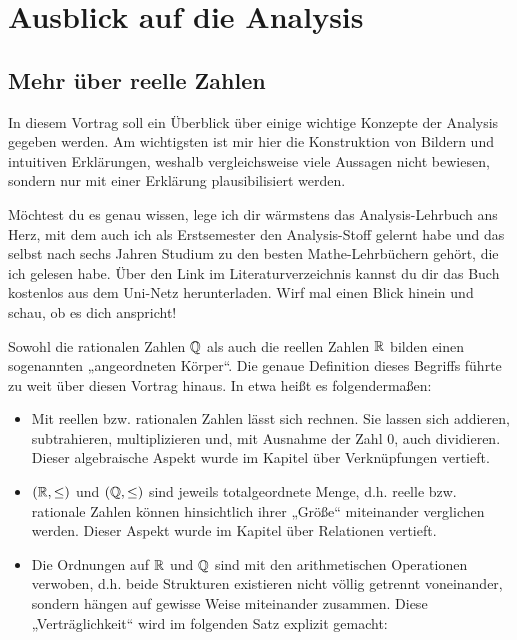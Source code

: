 



\chapter{Ausblick auf die Analysis}


\section{Mehr über reelle Zahlen}


\begin{bem}[Buchtipp]
    In diesem Vortrag soll ein Überblick über einige wichtige Konzepte der Analysis gegeben werden. Am wichtigsten ist mir hier die Konstruktion von Bildern und intuitiven Erklärungen, weshalb vergleichsweise viele Aussagen nicht bewiesen, sondern nur mit einer Erklärung plausibilisiert werden.
    
    Möchtest du es genau wissen, lege ich dir wärmstens das Analysis-Lehrbuch \cite{AE06} ans Herz, mit dem auch ich als Erstsemester den Analysis-Stoff gelernt habe und das selbst nach sechs Jahren Studium zu den besten Mathe-Lehrbüchern gehört, die ich gelesen habe. Über den Link im Literaturverzeichnis kannst du dir das Buch kostenlos aus dem Uni-Netz herunterladen. Wirf mal einen Blick hinein und schau, ob es dich anspricht!
\end{bem}


\begin{bem}
    Sowohl die rationalen Zahlen $\mathbb Q$ als auch die reellen Zahlen $\mathbb R$ bilden einen sogenannten „angeordneten Körper“. Die genaue Definition dieses Begriffs führte zu weit über diesen Vortrag hinaus. In etwa heißt es folgendermaßen:
    \begin{itemize}
        \item Mit reellen bzw. rationalen Zahlen lässt sich rechnen. Sie lassen sich addieren, subtrahieren, multiplizieren und, mit Ausnahme der Zahl $0$, auch dividieren. Dieser algebraische Aspekt wurde im Kapitel über Verknüpfungen vertieft.
        \item $(\mathbb R,\le)$ und $(\mathbb Q,\le)$ sind jeweils totalgeordnete Menge, d.h. reelle bzw. rationale Zahlen können hinsichtlich ihrer „Größe“ miteinander verglichen werden. Dieser Aspekt wurde im Kapitel über Relationen vertieft.
        \item Die Ordnungen auf $\mathbb R$ und $\mathbb Q$ sind mit den arithmetischen Operationen verwoben, d.h. beide Strukturen existieren nicht völlig getrennt voneinander, sondern hängen auf gewisse Weise miteinander zusammen. Diese „Verträglichkeit“ wird im folgenden Satz explizit gemacht:
    \end{itemize}
\end{bem}


